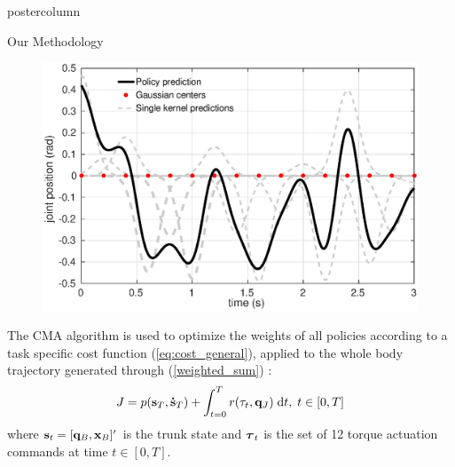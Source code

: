 \documentclass{beamer}
\begin{document}
\begin{frame}
\begin{columns}
\begin{column}{.3\textwidth}
\begin{beamercolorbox}[center]{postercolumn}
\begin{minipage}{.98\textwidth}
{\begin{myblock}{Our Methodology}
\begin{figure}[h!]
  \includegraphics[scale=1]{example_gr2.eps} 
\end{figure}
    
The CMA algorithm is used to optimize the weights of all 
policies according to a task specific cost function (\ref{eq:cost_general}), applied to the 
whole body trajectory generated through (\ref{weighted_sum}) : 
\begin{equation}
 \label{eq:cost_general}
  J = p (\mathbf{s}_T, \mathbf{\dot{s}}_T)+\int^{T}_{t=0}r(\mathbf{\tau}_t, \mathbf{q}_{J})\;\mathrm{d}t, \; t \in [0,T]
\end{equation}
\noindent
where $\mathbf{s}_t = [\mathbf{q}_{B}, \mathbf{x}_{B}]'$ is the trunk state
and $\boldsymbol{\tau}_t$ is the set of 12 torque actuation commands at time $t \in 
[0,T]$.



\end{myblock}}
\end{minipage}
\end{beamercolorbox}
\end{column}
\end{columns}
\end{frame}
\end{document}
